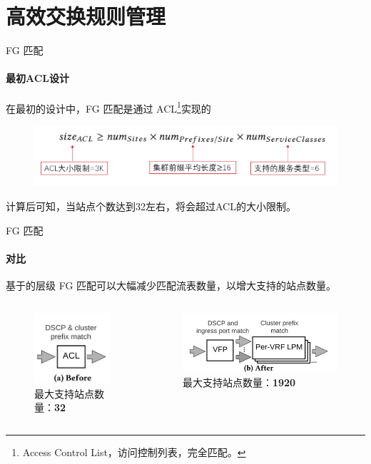 \section{高效交换规则管理}
\begin{frame}{FG 匹配}
    \framesubtitle{最初ACL设计}
    在最初的设计中，FG 匹配是通过 ACL\footnote{Access Control List，访问控制列表，完全匹配。}实现的
    \begin{figure}
        \centering
        \includegraphics[width=0.7\linewidth]{img/FG.png}
        \label{fig:my_label}
    \end{figure}
    计算后可知，当站点个数达到32左右，将会超过ACL的大小限制。
\end{frame}

\begin{frame}{FG 匹配}
    \framesubtitle{对比}
    基于的层级 FG 匹配可以大幅减少匹配流表数量，以增大支持的站点数量。
    \begin{columns}
        \begin{column}{0.4\textwidth}
            \begin{figure}
                \centering
                \includegraphics[width=0.4\linewidth]{img/FG2.png}
                \caption{最大支持站点数量：\textbf{32}}
            \end{figure}
        \end{column}
        \begin{column}{0.4\textwidth}
            \begin{figure}
                \centering
                \includegraphics[width=0.8\linewidth]{img/FG3.png}
                \caption{最大支持站点数量：\textbf{1920}}
            \end{figure}
        \end{column}
    \end{columns}
\end{frame}

